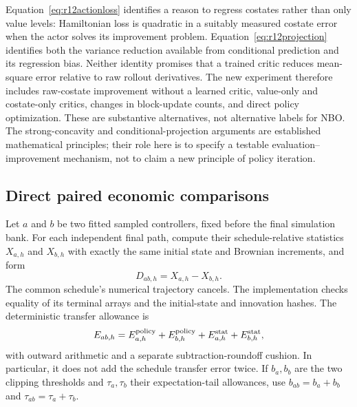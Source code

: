 Equation~\eqref{eq:r12actionloss} identifies a reason to regress costates rather than only value levels: Hamiltonian loss is quadratic in a suitably measured costate error when the actor solves its improvement problem. Equation~\eqref{eq:r12projection} identifies both the variance reduction available from conditional prediction and its regression bias. Neither identity promises that a trained critic reduces mean-square error relative to raw rollout derivatives. The new experiment therefore includes raw-costate improvement without a learned critic, value-only and costate-only critics, changes in block-update counts, and direct policy optimization. These are substantive alternatives, not alternative labels for NBO. The strong-concavity and conditional-projection arguments are established mathematical principles; their role here is to specify a testable evaluation--improvement mechanism, not to claim a new principle of policy iteration.

\subsection{Direct paired economic comparisons}
Let $a$ and $b$ be two fitted sampled controllers, fixed before the final simulation bank. For each independent final path, compute their schedule-relative statistics $X_{a,h}$ and $X_{b,h}$ with exactly the same initial state and Brownian increments, and form
\[
 D_{ab,h}=X_{a,h}-X_{b,h}.
\]
The common schedule's numerical trajectory cancels. The implementation checks equality of its terminal arrays and the initial-state and innovation hashes. The deterministic transfer allowance is
\[
 E_{ab,h}=E_{a,h}^{\rm policy}+E_{b,h}^{\rm policy}
              +E_{a,h}^{\rm stat}+E_{b,h}^{\rm stat},
\]
with outward arithmetic and a separate subtraction-roundoff cushion. In particular, it does not add the schedule transfer error twice. If $b_a,b_b$ are the two clipping thresholds and $\tau_a,\tau_b$ their expectation-tail allowances, use $b_{ab}=b_a+b_b$ and $\tau_{ab}=\tau_a+\tau_b$.


